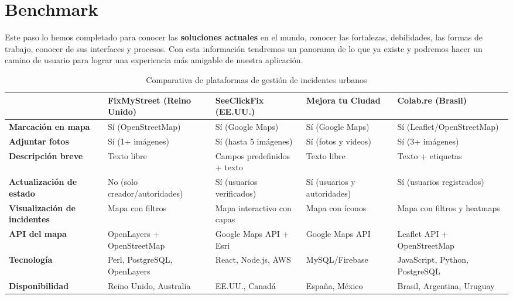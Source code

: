 \section{Benchmark}

Este paso lo hemos completado para conocer las \textbf{soluciones actuales} en el mundo, conocer las fortalezas, debilidades, las formas de trabajo, conocer de sus interfaces y procesos. Con esta información tendremos un panorama de lo que ya existe y podremos hacer un camino de usuario para lograr una experiencia más amigable de nuestra aplicación. 

\begin{table}[h!]
\centering
\begin{tabular}{|>{\centering\arraybackslash}m{2.5cm}|>{\centering\arraybackslash}m{3cm}|>{\centering\arraybackslash}m{2.5cm}|>{\centering\arraybackslash}m{3cm}|>{\centering\arraybackslash}m{3cm}|} %
\hline
\textbf{} & \textbf{FixMyStreet (Reino Unido)} & \textbf{SeeClickFix (EE.UU.)} & \textbf{Mejora tu Ciudad} & \textbf{Colab.re (Brasil)} \\ \hline
\textbf{Marcación en mapa} & Sí (OpenStreetMap) & Sí (Google Maps) & Sí (Google Maps) & Sí (Leaflet/OpenStreetMap) \\ \hline
\textbf{Adjuntar fotos} & Sí (1+ imágenes) & Sí (hasta 5 imágenes) & Sí (fotos y videos) & Sí (3+ imágenes) \\ \hline
\textbf{Descripción breve} & Texto libre & Campos predefinidos + texto & Texto libre & Texto + etiquetas \\ \hline
\textbf{Actualización de estado} & No (solo creador/autoridades) & Sí (usuarios verificados) & Sí (usuarios y autoridades) & Sí (usuarios registrados) \\ \hline
\textbf{Visualización de incidentes} & Mapa con filtros & Mapa interactivo con capas & Mapa con íconos & Mapa con filtros y heatmaps \\ \hline
\textbf{API del mapa} & OpenLayers + OpenStreetMap & Google Maps API + Esri & Google Maps API & Leaflet API + OpenStreetMap \\ \hline
\textbf{Tecnología} & Perl, PostgreSQL, OpenLayers & React, Node.js, AWS &  MySQL/Firebase  & JavaScript, Python, PostgreSQL \\ \hline
\textbf{Disponibilidad} & Reino Unido, Australia & EE.UU., Canadá &  España, México  & Brasil, Argentina, Uruguay \\ \hline
\end{tabular}
\caption{Comparativa de plataformas de gestión de incidentes urbanos}
\label{tab:comparativa}
\end{table}

